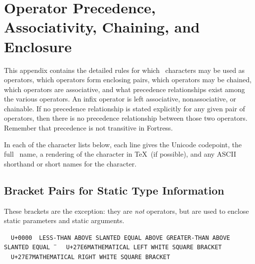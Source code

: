 %
%
%
%

\chapter{Operator Precedence, Associativity, Chaining, and Enclosure}

\newcommand{\UnicodeOp}[4]{~~\texttt{#1}\>\texttt{\footnotesize #2}\>{#3}\>{#4}}
\newcommand{\UnicodeKillLine}{~~\texttt{U+0000}~~\={\footnotesize\texttt{LESS-THAN ABOVE SLANTED EQUAL ABOVE GREATER-THAN ABOVE SLANTED EQUAL}}~~\=\quad\quad\=\kill}


This appendix contains the detailed rules
for which \unicode\ characters may be used as operators,
which operators form enclosing pairs,
which operators may be chained,
which operators are associative,
and what precedence relationships exist among the various operators.
An infix operator is left associative, nonassociative, or chainable.
If no precedence relationship is stated explicitly
for any given pair of operators,
then there is no precedence relationship between those two operators.
Remember that precedence is not transitive in Fortress.

In each of the character lists below,
each line gives the Unicode codepoint,
the full \unicode\ name,
a rendering of the character in \TeX\ (if possible),
and any ASCII shorthand or short names for the character.



\section{Bracket Pairs for Static Type Information}

These brackets are the exception: they are \emph{not} operators, but are used to enclose static parameters
and static arguments.

\begin{tabbing}
\UnicodeKillLine
\UnicodeOp{U+27E6}{MATHEMATICAL LEFT WHITE SQUARE BRACKET}{$[\![$}{\texttt{[{\char'134}}} \\
\UnicodeOp{U+27E7}{MATHEMATICAL RIGHT WHITE SQUARE BRACKET}{$]\!]$}{\texttt{{\char'134}]}}
\end{tabbing}

